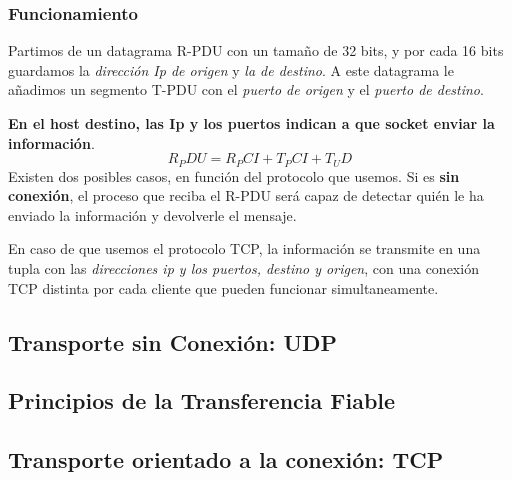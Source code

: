 \subsubsection{Funcionamiento}
\noindent Partimos de un datagrama R-PDU con un tamaño de 32 bits, y por cada 16 bits guardamos la \textit{dirección Ip de origen} y \textit{la de destino}.
A este datagrama le añadimos un segmento T-PDU con el \textit{puerto de origen} y el \textit{puerto de destino}.
\par \noindent \textbf{En el host destino, las Ip y los puertos indican a que socket enviar la información}.
\[
        \boxed{R_PDU = R_PCI + T_PCI + T_UD}
\]
\noindent Existen dos posibles casos, en función del protocolo que usemos. Si es \textbf{sin conexión}, el proceso que reciba el R-PDU será capaz de detectar quién le ha enviado la información y devolverle el mensaje.
\par \noindent En caso de que usemos el protocolo TCP, la información se transmite en una tupla con las \textit{direcciones ip y los puertos, destino y origen}, con una conexión TCP distinta por cada cliente que pueden funcionar simultaneamente.
\subsection{Transporte sin Conexión: UDP}
\subsection{Principios de la Transferencia Fiable}
\subsection{Transporte orientado a la conexión: TCP}